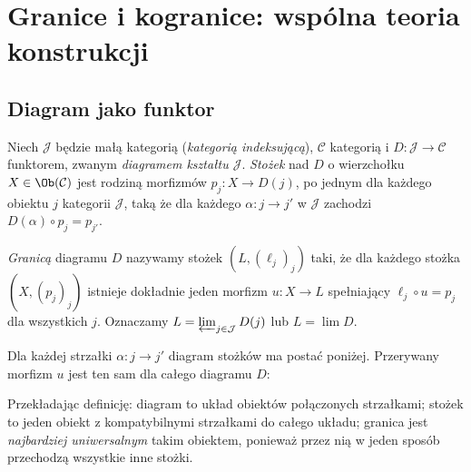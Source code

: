 \section{Granice i kogranice: wspólna teoria konstrukcji}\label{sec:granice}

\providecommand{\atlasref}[2]{#2}

\subsection{Diagram jako funktor}

\begin{definicja}\label{def:limit}
Niech $\mathcal J$ będzie małą kategorią (\emph{kategorią indeksującą}), $\mathcal C$ kategorią i $D:\mathcal J\to\mathcal C$ funktorem, zwanym \emph{diagramem kształtu $\mathcal J$}. \emph{Stożek} nad $D$ o wierzchołku $X\in\Ob(\mathcal C)$ jest rodziną morfizmów $p_j:X\to D(j)$, po jednym dla każdego obiektu $j$ kategorii $\mathcal J$, taką że dla każdego $\alpha:j\to j'$ w $\mathcal J$ zachodzi $D(\alpha)\circ p_j=p_{j'}$.

\emph{Granicą} diagramu $D$ nazywamy stożek $(L,(\ell_j)_j)$ taki, że dla każdego stożka $(X,(p_j)_j)$ istnieje dokładnie jeden morfizm $u:X\to L$ spełniający $\ell_j\circ u=p_j$ dla wszystkich $j$. Oznaczamy $L=\varprojlim_{j\in\mathcal J}D(j)$ lub $L=\lim D$.
\end{definicja}
Dla każdej strzałki $\alpha:j\to j'$ diagram stożków ma postać poniżej. Przerywany morfizm $u$ jest ten sam dla całego diagramu $D$:
\begin{center}
\end{center}

Przekładając definicję: diagram to układ obiektów połączonych strzałkami; stożek to jeden obiekt z kompatybilnymi strzałkami do całego układu; granica jest \emph{najbardziej uniwersalnym} takim obiektem, ponieważ przez nią w jeden sposób przechodzą wszystkie inne stożki.

